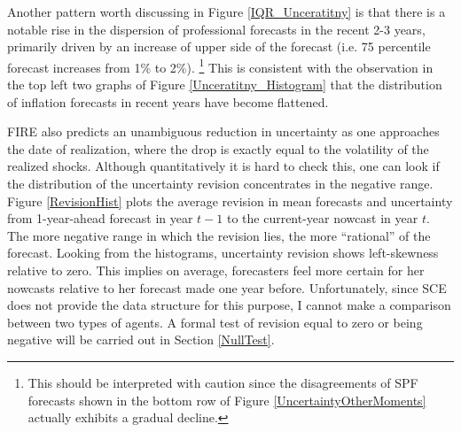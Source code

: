 \documentclass[12pt]{article}
\begin{document}
	Another pattern worth discussing in Figure \ref{IQR_Unceratitny} is that there is a notable rise in the dispersion of professional forecasts in the recent 2-3 years, primarily driven by an increase of upper side of the forecast (i.e. 75 percentile forecast increases from 1\% to 2\%). \footnote{This should be interpreted with caution since the disagreements of SPF forecasts shown in the bottom row of Figure \ref{UncertaintyOtherMoments} actually exhibits a gradual decline. } This is consistent with the observation in the top left two graphs of Figure \ref{Unceratitny_Histogram} that the distribution of inflation forecasts in recent years have become flattened.
	
	FIRE also predicts an unambiguous reduction in uncertainty as one approaches the date of realization, where the drop is exactly equal to the volatility of the realized shocks. Although quantitatively it is hard to check this, one can look if the distribution of the uncertainty revision concentrates in the negative range. Figure \ref{RevisionHist} plots the average revision in mean forecasts and uncertainty from 1-year-ahead forecast in year $t-1$ to the current-year nowcast in year $t$. The more negative range in which the revision lies, the more ``rational'' of the forecast. Looking from the histograms, uncertainty revision shows left-skewness relative to zero. This implies on average,  forecasters feel more certain for her nowcasts relative to her forecast made one year before.  Unfortunately, since SCE does not provide the data structure for this purpose, I cannot make a comparison between two types of agents. A formal test of revision equal to zero or being negative will be carried out in Section \ref{NullTest}. 
	
\end{document}
